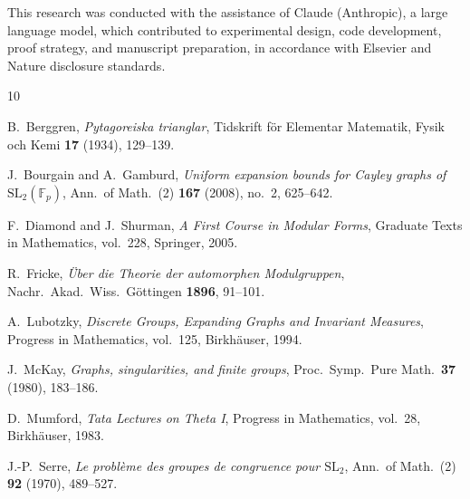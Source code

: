 \documentclass[12pt]{amsart}
\theoremstyle{definition}
\theoremstyle{remark}
\newcommand{\SL}{\mathrm{SL}}
\newcommand{\Fp}{\mathbb{F}_p}
\begin{document}
This research was conducted with the assistance of Claude (Anthropic),
a large language model, which contributed to experimental design, code
development, proof strategy, and manuscript preparation, in accordance
with Elsevier and Nature disclosure standards.


\begin{thebibliography}{10}

B.~Berggren,
\emph{Pytagoreiska trianglar},
Tidskrift f\"or Elementar Matematik, Fysik och Kemi \textbf{17} (1934),
129--139.

J.~Bourgain and A.~Gamburd,
\emph{Uniform expansion bounds for Cayley graphs of $\SL_2(\Fp)$},
Ann.\ of Math.\ (2) \textbf{167} (2008), no.~2, 625--642.

F.~Diamond and J.~Shurman,
\emph{A First Course in Modular Forms},
Graduate Texts in Mathematics, vol.~228, Springer, 2005.

R.~Fricke,
\emph{\"Uber die Theorie der automorphen Modulgruppen},
Nachr.\ Akad.\ Wiss.\ G\"ottingen \textbf{1896}, 91--101.

A.~Lubotzky,
\emph{Discrete Groups, Expanding Graphs and Invariant Measures},
Progress in Mathematics, vol.~125, Birkh\"auser, 1994.

J.~McKay,
\emph{Graphs, singularities, and finite groups},
Proc.\ Symp.\ Pure Math.\ \textbf{37} (1980), 183--186.

D.~Mumford,
\emph{Tata Lectures on Theta I},
Progress in Mathematics, vol.~28, Birkh\"auser, 1983.

J.-P.~Serre,
\emph{Le probl\`eme des groupes de congruence pour $\SL_2$},
Ann.\ of Math.\ (2) \textbf{92} (1970), 489--527.

\end{thebibliography}
\end{document}
